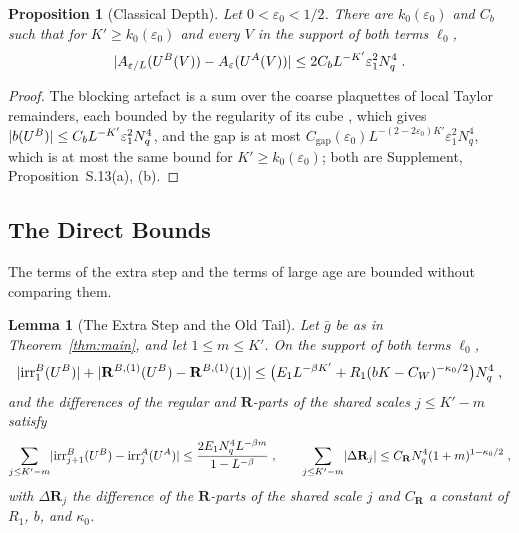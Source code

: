 \documentclass[11pt]{preprint}
\DeclarePairedDelimiter{\abs}{\lvert}{\rvert}
\numberwithin{equation}{section}
\newtheorem{proposition}[theorem]{Proposition}
\newtheorem{lemma}[theorem]{Lemma}
\theoremstyle{definition}
\theoremstyle{remark}
\theoremstyle{plain}
\begin{document}
\begin{proposition}[Classical Depth]\label{prop:classical-depth}
Let $0 < \varepsilon_0 < 1/2$. There are $k_0(\varepsilon_0)$ and $C_b$ such that for $K' \geq k_0(\varepsilon_0)$ and every $V$ in the support of both terms $\ell_0$,
\begin{equation}\label{eq:classical-depth}
    \abs{A_{\varepsilon/L}(U^B(V)) - A_\varepsilon(U^A(V))} \leq 2C_bL^{-K'}\varepsilon_1^2N_q^4\;.
\end{equation}
\end{proposition}

\begin{proof}
The blocking artefact is a sum over the coarse plaquettes of local Taylor remainders, each bounded by the regularity of its cube \cite[Theorem~1, (9), (10), p.~279]{BalabanVAR}, which gives $\abs{b(U^B)} \leq C_bL^{-K'}\varepsilon_1^2N_q^4$, and the gap is at most $C_{\mathrm{gap}}(\varepsilon_0)L^{-(2-2\varepsilon_0)K'}\varepsilon_1^2N_q^4$, which is at most the same bound for $K' \geq k_0(\varepsilon_0)$; both are Supplement, Proposition~S.13(a), (b).
\end{proof}

\subsection{The Direct Bounds}\label{sec:direct-bounds}

The terms of the extra step and the terms of large age are bounded without comparing them.

\begin{lemma}[The Extra Step and the Old Tail]\label{lem:direct-bounds}
Let $\bar g$ be as in Theorem~\ref{thm:main}, and let $1 \leq m \leq K'$. On the support of both terms $\ell_0$,
\begin{equation}\label{eq:extra-step}
    \abs{\mathrm{irr}^B_1(U^B)} + \abs{\mathbf R^{B,(1)}(U^B) - \mathbf R^{B,(1)}(1)} \leq \bigl(E_1L^{-\beta K'} + R_1(bK - C_W)^{-\kappa_0/2}\bigr)N_q^4\;,
\end{equation}
and the differences of the regular and $\mathbf R$-parts of the shared scales $j \leq K' - m$ satisfy
\begin{equation}\label{eq:old-tail}
    \sum_{j \leq K'-m}\abs{\mathrm{irr}^B_{j+1}(U^B) - \mathrm{irr}^A_j(U^A)} \leq \frac{2E_1N_q^4L^{-\beta m}}{1 - L^{-\beta}}\;,
    \qquad
    \sum_{j \leq K'-m}\abs{\Delta\mathbf R_j} \leq C_{\mathbf R}N_q^4(1 + m)^{1-\kappa_0/2}\;,
\end{equation}
with $\Delta\mathbf R_j$ the difference of the $\mathbf R$-parts of the shared scale $j$ and $C_{\mathbf R}$ a constant of $R_1$, $b$, and $\kappa_0$.
\end{lemma}
\end{document}
